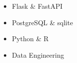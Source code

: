 \begin{itemize}
    \item Flask \& FastAPI
    \item PostgreSQL \& sqlite
    \item Python \& R
    \item Data Engineering
\end{itemize}